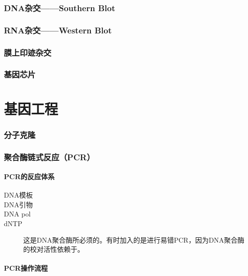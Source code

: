 \subsubsection{DNA杂交——Southern Blot}


\subsubsection{RNA杂交——Western Blot}

\subsubsection{膜上印迹杂交}

\subsubsection{基因芯片}

\section{基因工程}

\subsubsection{分子克隆}

\subsubsection{聚合酶链式反应（PCR）}

\paragraph{PCR的反应体系}

\begin{description}
	\item[DNA模板]
	\item[DNA引物]
	\item[DNA pol]
	\item[dNTP]
	\item[] 这是DNA聚合酶所必须的。有时加入的是进行易错PCR，因为DNA聚合酶的校对活性依赖于。
\end{description}

\paragraph{PCR操作流程}

